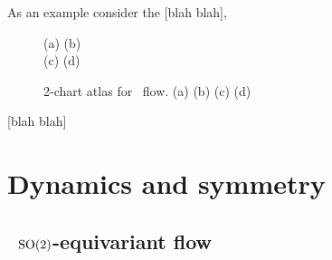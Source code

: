 \documentclass[aip,cha,reprint,
secnumarabic,
nofootinbib, tightenlines,
nobibnotes, showkeys, showpacs,
groupedaddress
]{revtex4-1}
\begin{document}
As an example consider the  [blah blah],

\begin{figure}
 \begin{center}
 \setlength{\unitlength}{0.20\textwidth}
(a)
(b)
\\
(c)
(d)
 \end{center}
    \caption{
2-chart atlas for \twoMode\ flow.
(a)
(b)
(c)
(d)
    }
\label{fig:2modeSects}
\end{figure}

 [blah blah]

\section{Dynamics and symmetry}
\label{s:symm}

\subsection{\twoMode\ $\textrm{SO}(2)$-equivariant flow}
\label{s:twoMode}
\end{document}
